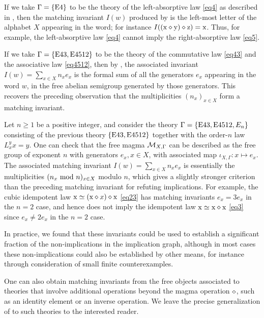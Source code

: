 \begin{example}  If we take $\Gamma = \{\mathrm{E}4\}$ to be the theory of the left-absorptive law \eqref{eq4} as described in , then the matching invariant $I(w)$ produced by  is the left-most letter of the alphabet $X$ appearing in the word; for instance $I((\mathrm{x} \diamond \mathrm{y}) \diamond \mathrm{z}) = \mathrm{x}$.  Thus, for example, the left-absorptive law \eqref{eq4} cannot imply the right-absorptive law \eqref{eq5}.
\end{example}

\begin{example}  If we take $\Gamma = \{\mathrm{E}43, \mathrm{E}4512\}$ to be the theory of the commutative law \eqref{eq43} and the associative law \eqref{eq4512}, then by , the associated invariant $I(w) = \sum_{x \in X} n_x e_x$ is the formal sum of all the generators $e_x$ appearing in the word $w$, in the free abelian semigroup generated by those generators.  This recovers the preceding observation that the multiplicities $(n_x)_{x \in X}$ form a matching invariant.
\end{example}

\begin{example}  Let $n \geq 1$ be a positive integer, and consider the theory $\Gamma = \{\mathrm{E}43, \mathrm{E}4512, E_n\}$ consisting of the previous theory $\{\mathrm{E}43, \mathrm{E}4512\}$ together with the order-$n$ law $L_x^y x = y$.  One can check that the free magma ${\mathcal{M}}_{X,\Gamma}$ can be described as the free group of exponent $n$ with generators $e_x, x \in X$, with associated map $\iota_{X,\Gamma} \colon x \mapsto e_x$.  The associated matching invariant $I(w) = \sum_{x \in X} n_x e_x$ is essentially the multiplicities $(n_x \hbox{ mod } n)_{x \in X}$ modulo $n$, which gives a slightly stronger criterion than the preceding matching invariant for refuting implications.  For example, the cubic idempotent law $\mathrm{x} \simeq (\mathrm{x} \diamond x) \diamond \mathrm{x}$ \eqref{eq23}
has matching invariants $e_x = 3e_x$ in the $n=2$ case, and hence does not imply the idempotent law $\mathrm{x} \simeq \mathrm{x} \diamond \mathrm{x}$ \eqref{eq3} since $e_x \neq 2e_x$ in the $n=2$ case.
\end{example}

In practice, we found that these invariants could be used to establish a significant fraction of the non-implications in the implication graph, although in most cases these non-implications could also be established by other means, for instance through consideration of small finite counterexamples.

\begin{remark}  One can also obtain matching invariants from the free objects associated to theories that involve additional operations beyond the magma operation $\diamond$, such as an identity element or an inverse operation.  We leave the precise generalization of  to such theories to the interested reader.
\end{remark}


